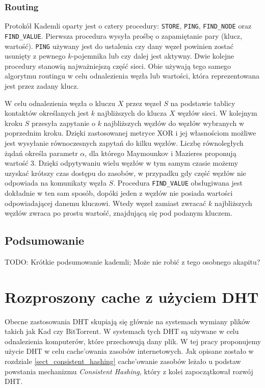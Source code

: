 \documentclass[a4paper,11pt]{scrartcl}
\newcommand{\f}{\texttt}
\newcommand{\s}{ }
\newcommand{\kesz}{cache}
\newcommand{\keszowania}{cache'owania}
\newcommand{\keszowanie}{cache'owanie}
\begin{document}
\subsubsection{Routing}
\label{kad_routing}
Protokół Kademli oparty jest o cztery procedury: \f{STORE}, \f{PING}, \f{FIND\_NODE} oraz \f{FIND\_VALUE}. Pierwsza procedura wysyła prośbę o zapamiętanie pary (klucz, wartość). \f{PING} używany jest do ustalenia czy dany węzeł powinien zostać usunięty z pewnego $k$-pojemnika lub czy dalej jest aktywny. Dwie kolejne procedury stanowią najważniejszą część sieci. Obie używają tego samego algorytmu routingu w celu odnalezienia węzła lub wartości, która reprezentowana jest przez zadany klucz.

W celu odnalezienia węzła o kluczu $X$ przez węzeł $S$ na podstawie tablicy kontaktów określanych jest $k$ najbliższych do klucza $X$ węzłów sieci. W kolejnym kroku $S$ przesyła zapytanie o $k$ najbliższych węzłów do węzłów wybranych w poprzednim kroku. Dzięki zastosowanej metryce XOR i jej własnościom możliwe jest wysyłanie równoczesnych zapytań do kilku węzłów. Liczbę równoległych żądań określa parametr $\alpha$, dla którego Maymounkov i Mazieres proponują wartość 3. Dzięki odpytywaniu wielu węzłów w tym samym czasie możemy uzyskać krótszy czas dostępu do zasobów, w przypadku gdy część węzłów nie odpowiada na komunikaty węzła $S$. Procedura \f{FIND\_VALUE} obsługiwana jest dokładnie w ten sam sposób, dopóki jeden z węzłów nie posiada wartości odpowiadającej danemu kluczowi. Wtedy węzeł zamiast zwracać $k$ najbliższych węzłów zwraca po prostu wartość, znajdującą się pod podanym kluczem.

\subsection{Podsumowanie}
TODO: Krótkie podsumowanie kademli; Może nie robić z tego osobnego akapitu?

\section{Rozproszony \kesz\s z użyciem DHT}
Obecne zastosowania DHT skupiają się głównie na systemach wymiany plików takich jak Kad czy BitTorrent. W systemach tych DHT są używane w celu odnalezienia komputerów, które przechowują dany plik. W tej pracy proponujemy użycie DHT w celu \keszowania\s zasobów internetowych. Jak opisane zostało w rozdziale \ref{sect_consistent_hashing} \keszowanie\s zasobów leżało u podstaw powstania mechanizmu \textit{Consistent Hashing}, który z kolei zapoczątkował rozwój DHT.
\end{document}
